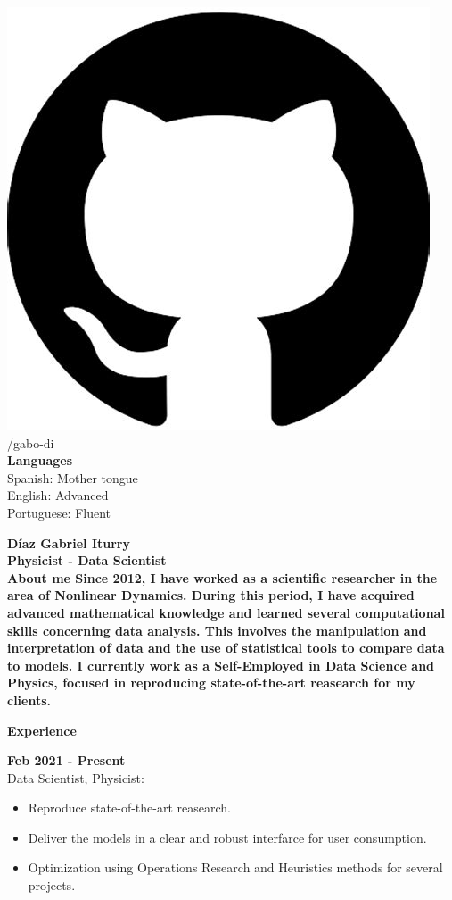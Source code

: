 \documentclass[a4paper,12pt,final]{memoir}
\newcommand{\Sep}{\vspace{1.5em}}
\newcommand{\SmallSep}{\vspace{0.5em}}
\newenvironment{AboutMe}
	{\ignorespaces\textbf{\color{RoyalBlue} About me}}
	{\Sep\ignorespacesafterend}
\newcommand{\CVSection}[1]
	{\Large\textbf{#1}\par
	\SmallSep\normalsize\normalfont}
\newcommand{\CVItem}[1]
	{\textbf{\color{RoyalBlue} #1}}
\begin{document}
\begin{flushleft}
    \includegraphics[width=0.07\columnwidth]{git.jpeg} /gabo-di \\
    \vspace{1mm}
    \vspace{4mm}
	\textbf{Languages}\\
	\vspace{1mm}
	Spanish: Mother tongue\\
	\vspace{1mm}
	English: Advanced\\
	\vspace{1mm}
	Portuguese: Fluent
\end{flushleft}\normalsize


\framebreak



\Huge\bfseries {\color{RoyalBlue} D\'iaz Gabriel Iturry} \\
\Large\bfseries Physicist - Data Scientist\\

\normalsize\normalfont
\vspace{-10pt} 
\begin{AboutMe}
Since 2012, I have worked as a scientific researcher in the area of Nonlinear Dynamics. During this period, I have acquired advanced mathematical knowledge and learned several computational skills concerning data analysis. This involves the manipulation and interpretation of data and the use of statistical tools to compare data to models. I currently work as a Self-Employed in Data Science and Physics, focused in  reproducing state-of-the-art reasearch for my clients.
\end{AboutMe}

\vspace{-15pt} 
\CVSection{Experience}
\CVItem{Feb 2021 - Present}\\
{\small Data Scientist, Physicist:}
\begin{footnotesize}
\begin{itemize}
\item Reproduce state-of-the-art reasearch.
\item Deliver the models in a clear and robust interfarce for user consumption.
\item Optimization using Operations Research and Heuristics methods for several projects.
\end{itemize}
\end{footnotesize}
\SmallSep
\end{document}
